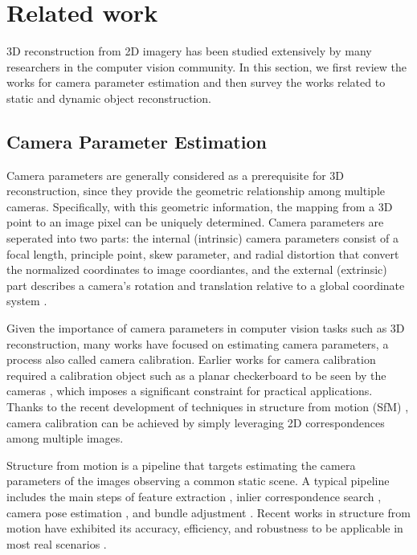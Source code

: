 \chapter{Related work}

3D reconstruction from 2D imagery has been studied extensively by many researchers in the computer vision community. In this section, we first review the works for camera parameter estimation and then survey the works related to static and dynamic object reconstruction.

\section{Camera Parameter Estimation}
Camera parameters are generally considered as a prerequisite for 3D reconstruction, since they provide the geometric relationship among multiple cameras. Specifically, with this geometric information, the mapping from a 3D point to an image pixel can be uniquely determined.
Camera parameters are seperated into two parts: the internal (intrinsic) camera parameters consist of a focal length, principle point, skew parameter, and radial distortion that convert the normalized coordinates to image coordiantes, and the external (extrinsic) part describes a camera's rotation and translation relative to a global coordinate system \cite{Hartley2004}. 

Given the importance of camera parameters in computer vision tasks such as 3D reconstruction, many works have focused on estimating camera parameters, a process also called camera calibration. Earlier works for camera calibration required a calibration object such as a planar checkerboard to be seen by the cameras \cite{conf/cvpr/SturmM99,zhang2000flexible,caltoolbox}, which imposes a significant constraint for practical applications. Thanks to the recent development of techniques in structure from motion (SfM) \cite{Snavely2,snavely2008modeling,WuVSFM,wilson2013network,heinly2014_duplicate_structure,schoenberger2015paige,Heinly,heinly_dissertation,zheng2015_structureless_resection}, camera calibration can be achieved by simply leveraging 2D correspondences among multiple images. 

Structure from motion is a pipeline that targets estimating the camera parameters of the images observing a common static scene. A typical pipeline includes the main steps of feature extraction \cite{lowe2004_sift,rublee2011_orb,bay2008_surf}, inlier correspondence search \cite{raguram2013usac}, camera pose estimation \cite{nister2003_five_point,kneip2011novel,zheng2014general,zheng2015_structureless_resection}, and bundle adjustment \cite{agarwal2010_ba,wu2011_multicore_ba}. Recent works  in structure from motion have exhibited its accuracy, efficiency, and robustness to be applicable in most real scenarios \cite{Snavely2,WuVSFM}.

